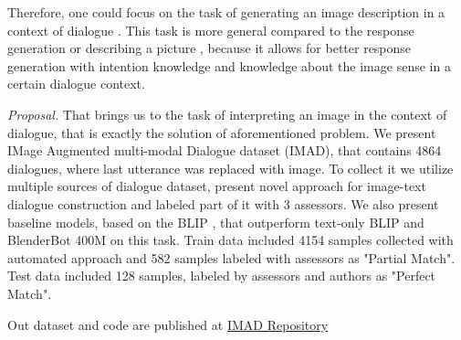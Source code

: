 \smallskip

Therefore, one could focus on the task of generating an image description in a context of dialogue \cite{Lee-2021,mm_chat}. This task is more general compared to the response generation \cite{chat-gpt} or describing a picture \cite{blip2}, because it allows for better response generation with intention knowledge and knowledge about the image sense in a certain dialogue context.

\smallskip

\textit{Proposal.} That brings us to the task of interpreting an image in the context of dialogue, that is exactly the solution of aforementioned problem. We present IMage Augmented multi-modal Dialogue dataset (IMAD), that contains 4864 dialogues, where last utterance was replaced with image. To collect it we utilize multiple sources of dialogue dataset, present novel approach for image-text dialogue construction and labeled part of it with 3 assessors. We also present baseline models, based on the BLIP \cite{blip}, that outperform text-only BLIP and BlenderBot 400M  \cite{blenderbot} on this task. Train data included 4154 samples collected with automated approach and 582 samples labeled with assessors as "Partial Match". Test data included 128 samples, labeled by assessors and authors as "Perfect Match". 

\smallskip

Out dataset and code are published at \href{https://github.com/VityaVitalich/IMAD}{IMAD Repository}
